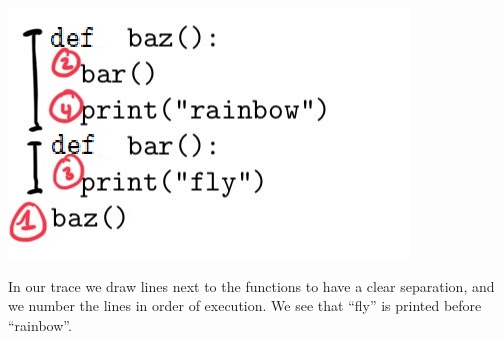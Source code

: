 \includegraphics[width=.4\textwidth]{1-trace-calls.jpeg}

In our trace we draw lines next to the functions to have a clear separation, and we number the lines in order of execution. We see that ``fly'' is printed before ``rainbow''.
